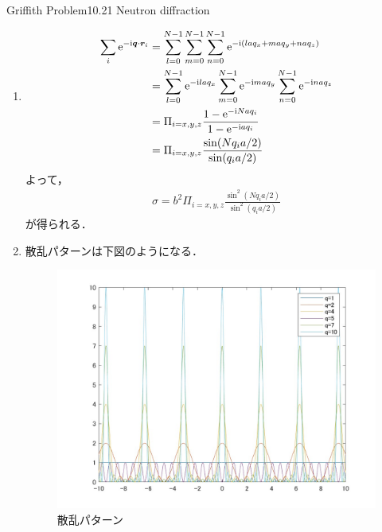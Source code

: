 \documentclass{report}
\begin{document}
\begin{myexc}{Griffith Problem10.21 Neutron diffraction}{}
\begin{enumerate}
\begin{align}
            \sigma = \abs{f^{(1)}(\theta)}^2 = b^2\abs{\sum_{i} \e^{-\i \bm{q}\cdot\bm{r}_i}}^2
          \end{align}
          である．
    \item \begin{align}
            \sum_{i} \mathrm{e}^{-\mathrm{i} \bm{q}\cdot\bm{r}_i} &= \sum_{l=0}^{N-1} \sum_{m=0}^{N-1} \sum_{n=0}^{N-1} \mathrm{e}^{-\mathrm{i}(laq_x + maq_y + naq_z)}\\
            &= \sum_{l=0}^{N-1} \mathrm{e}^{-\mathrm{i} laq_x} \sum_{m=0}^{N-1} \mathrm{e}^{-\mathrm{i} maq_y} \sum_{n=0}^{N-1} \mathrm{e}^{-\mathrm{i} naq_z}\\
            &= \Pi_{i=x,y,z} \frac{1-\mathrm{e}^{-\mathrm{i} Naq_i}}{1-\mathrm{e}^{-\mathrm{i} aq_i}}\\
            &= \Pi_{i =x,y,z} \frac{\sin(Nq_i a/2)}{\sin (q_i a/2)}
          \end{align}
          よって，
          \begin{align}
            \sigma = b^2 \Pi_{i =x,y,z} \frac{\sin^2(Nq_i a/2)}{\sin^2 (q_i a/2)}
          \end{align}
          が得られる．
    \item 散乱パターンは下図のようになる．
          \begin{figure}[H]
            \centering
            \includegraphics[width=0.8\columnwidth]{fig/neutron_diffraction.jpg}
            \caption{散乱パターン}
            \label{neutron-diffraction}
          \end{figure}
  \end{enumerate}
  \end{myexc}
\end{document}
